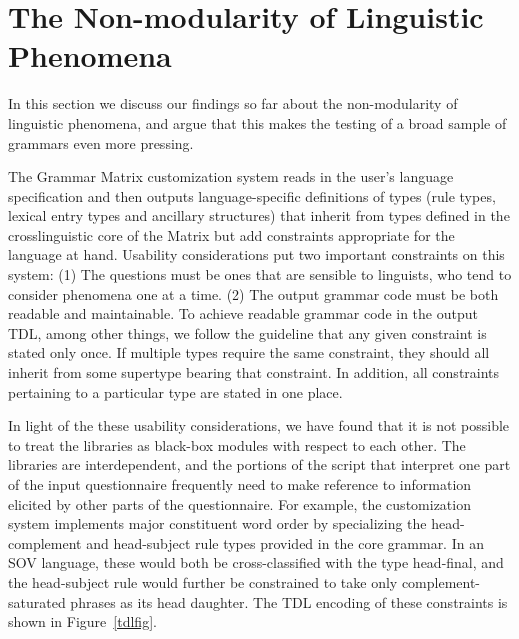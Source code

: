 \documentclass[11pt]{article}
\begin{document}
\section{The Non-modularity of Linguistic Phenomena}

In this section we discuss our findings so far about the
non-modularity of linguistic phenomena, and argue that this
makes the testing of a broad sample of grammars even more pressing.

The Grammar Matrix customization system reads in the user's language
specification and then outputs language-specific definitions of types
(rule types, lexical entry types and ancillary structures) that
inherit from types defined in the crosslinguistic core of the Matrix
but add constraints appropriate for the language at hand. 
Usability considerations put two important constraints on this system:
(1) The questions must be ones that are sensible to linguists,
who tend to consider phenomena one at a time.  
(2) The output grammar code must be both readable and maintainable.
To achieve readable grammar code in the output TDL, among other
things, we follow the guideline that any given constraint is
stated only once.  If multiple types require the same constraint, they
should all inherit from some supertype bearing that constraint.
In addition, all constraints pertaining to a particular type are
stated in one place.

In light of the these usability considerations, we
have found that it is not possible to treat the libraries as black-box
modules with respect to each other.  The libraries are interdependent,
and the portions of the script that interpret one part of the input
questionnaire frequently need to make reference to information
elicited by other parts of the questionnaire.  For example, the
customization system implements major constituent word order by
specializing the head-complement and head-subject rule types provided
in the core grammar.  In an SOV language, these would both be
cross-classified with the type head-final, and the head-subject rule
would further be constrained to take only complement-saturated phrases
as its head daughter.  The TDL encoding of these constraints is shown
in Figure~\ref{tdlfig}.
\end{document}
